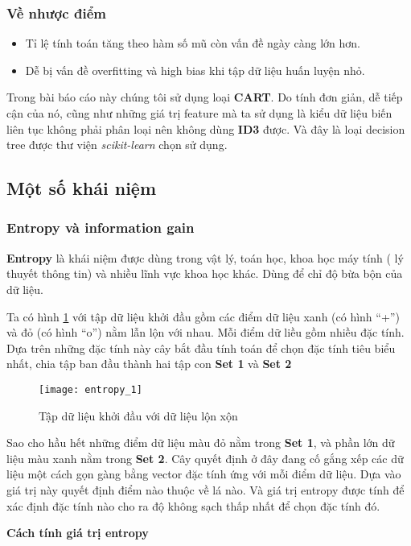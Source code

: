 \documentclass[../main-report.tex]{subfiles}
\begin{document}
\subsubsection*{Về nhược điểm}
\begin{itemize}
\item Tỉ lệ tính toán tăng theo hàm số mũ còn vấn đề ngày càng lớn hơn.
\item Dễ bị vấn đề overfitting và high bias khi tập dữ liệu huấn luyện nhỏ.
\end{itemize}

Trong bài báo cáo này chúng tôi sử dụng loại \textbf{CART}. Do tính đơn giản, dễ tiếp cận của nó, cũng như những giá trị feature mà ta sử dụng là kiểu dữ liệu biến liên tục không phải phân loại nên không dùng \textbf{ID3} được. Và đây là loại decision tree được thư viện \textit{scikit-learn} chọn sử dụng.
\subsection{Một số khái niệm}
\subsubsection{Entropy và information gain}
\textbf{Entropy} là khái niệm được dùng trong vật lý, toán học, khoa học máy tính ( lý thuyết thông tin) và nhiều lĩnh vực khoa học khác. Dùng để chỉ độ bừa bộn của dữ liệu.

Ta có hình \ref{fig:entropy_1} với tập dữ liệu khởi đầu gồm các điểm dữ liệu xanh (có hình ``+'') và đỏ (có hình ``o'') nằm lẫn lộn với nhau. Mỗi điểm dữ liều gồm nhiều đặc tính. Dựa trên những đặc tính này cây bắt đầu tính toán để chọn đặc tính tiêu biểu nhất, chia tập ban đầu thành hai tập con \textbf{Set 1} và \textbf{Set 2}

\begin{figure}[ht!]
\centering\texttt{[image: entropy\_1]}
\caption{Tập dữ liệu khởi đầu với dữ liệu lộn xộn}
\label{fig:entropy_1}
\end{figure}

Sao cho hầu hết những điểm dữ liệu màu đỏ nằm trong \textbf{Set 1}, và phần lớn dữ liệu màu xanh nằm trong \textbf{Set 2}. Cây quyết định ở đây đang cố gắng xếp các dữ liệu một cách gọn gàng bằng vector đặc tính ứng với mỗi điểm dữ liệu. Dựa vào giá trị này quyết định điểm nào thuộc về lá nào. Và giá trị entropy được tính để xác định đặc tính nào cho ra độ không sạch thấp nhất để chọn đặc tính đó.

\textbf{Cách tính giá trị entropy}
\end{document}
